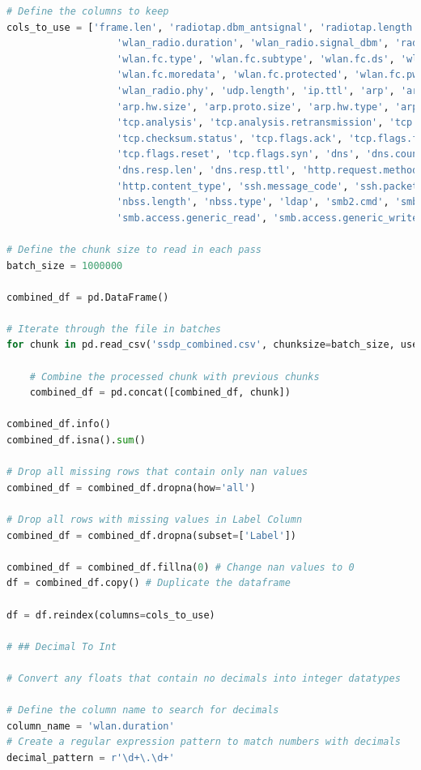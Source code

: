 \begin{appendices}
\begin{lstlisting}[language=Python]
# Define the columns to keep
cols_to_use = ['frame.len', 'radiotap.dbm_antsignal', 'radiotap.length', 'wlan.duration',
                   'wlan_radio.duration', 'wlan_radio.signal_dbm', 'radiotap.present.tsft',
                   'wlan.fc.type', 'wlan.fc.subtype', 'wlan.fc.ds', 'wlan.fc.frag',
                   'wlan.fc.moredata', 'wlan.fc.protected', 'wlan.fc.pwrmgt', 'wlan.fc.retry',
                   'wlan_radio.phy', 'udp.length', 'ip.ttl', 'arp', 'arp.proto.type',
                   'arp.hw.size', 'arp.proto.size', 'arp.hw.type', 'arp.opcode',
                   'tcp.analysis', 'tcp.analysis.retransmission', 'tcp.option_len',
                   'tcp.checksum.status', 'tcp.flags.ack', 'tcp.flags.fin', 'tcp.flags.push',
                   'tcp.flags.reset', 'tcp.flags.syn', 'dns', 'dns.count.queries', 'dns.count.answers',
                   'dns.resp.len', 'dns.resp.ttl', 'http.request.method', 'http.response.code',
                   'http.content_type', 'ssh.message_code', 'ssh.packet_length', 'nbns',
                   'nbss.length', 'nbss.type', 'ldap', 'smb2.cmd', 'smb.flags.response',
                   'smb.access.generic_read', 'smb.access.generic_write', 'smb.access.generic_execute','Label']

# Define the chunk size to read in each pass
batch_size = 1000000

combined_df = pd.DataFrame()

# Iterate through the file in batches
for chunk in pd.read_csv('ssdp_combined.csv', chunksize=batch_size, usecols=cols_to_use, low_memory=False):
    
    # Combine the processed chunk with previous chunks
    combined_df = pd.concat([combined_df, chunk])

combined_df.info()
combined_df.isna().sum()

# Drop all missing rows that contain only nan values
combined_df = combined_df.dropna(how='all')

# Drop all rows with missing values in Label Column
combined_df = combined_df.dropna(subset=['Label'])

combined_df = combined_df.fillna(0) # Change nan values to 0
df = combined_df.copy() # Duplicate the dataframe

df = df.reindex(columns=cols_to_use)

# ## Decimal To Int

# Convert any floats that contain no decimals into integer datatypes

# Define the column name to search for decimals
column_name = 'wlan.duration'
# Create a regular expression pattern to match numbers with decimals
decimal_pattern = r'\d+\.\d+'


\end{lstlisting}
\end{appendices}

